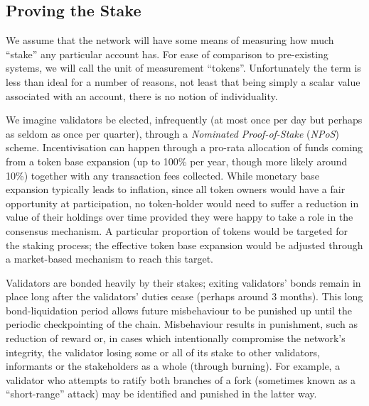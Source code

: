 \documentclass[9pt,oneside]{amsart}
\begin{document}
\begin{multicols}{2}
\subsection{Proving the Stake}\label{proving-the-stake}

 We assume that the network will have some means of measuring how much ``stake'' any particular account has. For ease of comparison to pre-existing systems, we will call the unit of measurement ``tokens''. Unfortunately the term is less than ideal for a number of reasons, not least that being simply a scalar value associated with an account, there is no notion of individuality.

 We imagine validators be elected, infrequently (at most once per day but perhaps as seldom as once per quarter), through a \textit{Nominated Proof-of-Stake} (\textit{NPoS}) scheme. Incentivisation can happen through a pro-rata allocation of funds coming from a token base expansion (up to 100\% per year, though more likely around 10\%) together with any transaction fees collected. While monetary base expansion typically leads to inflation, since all token owners would have a fair opportunity at participation, no token-holder would need to suffer a reduction in value of their holdings over time provided they were happy to take a role in the consensus mechanism. A particular proportion of tokens would be targeted for the staking process; the effective token base expansion would be adjusted through a market-based mechanism to reach this target.

 Validators are bonded heavily by their stakes; exiting validators' bonds remain in place long after the validators' duties cease (perhaps around 3 months). This long bond-liquidation period allows future misbehaviour to be punished up until the periodic checkpointing of the chain. Misbehaviour results in punishment, such as reduction of reward or, in cases which intentionally compromise the network's integrity, the validator losing some or all of its stake to other validators, informants or the stakeholders as a whole (through burning). For example, a validator who attempts to ratify both branches of a fork (sometimes known as a ``short-range'' attack) may be identified and punished in the latter way.


\end{multicols}
\end{document}
